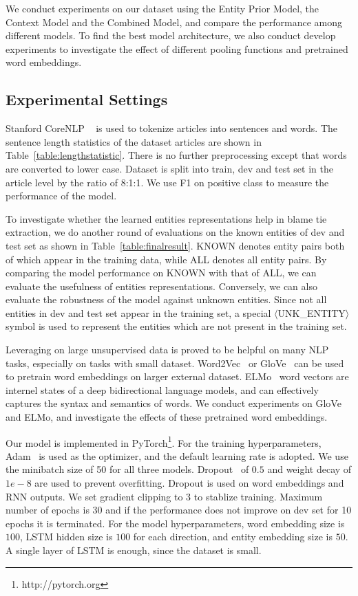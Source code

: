 \documentclass[11pt,a4paper]{article}
\begin{document}
We conduct experiments on our dataset using the Entity Prior Model, the Context Model and the Combined Model, and compare the performance among different models. To find the best model architecture, we also conduct develop experiments to investigate the effect of different pooling functions and pretrained word embeddings.

\subsection{Experimental Settings}

Stanford CoreNLP ~\cite{manning-EtAl:2014:P14-5} is used to tokenize articles into sentences and words. The sentence length statistics of the dataset articles are shown in Table~\ref{table:lengthstatistic}. There is no further preprocessing except that words are converted to lower case. Dataset is split into train, dev and test set in the article level by the ratio of 8:1:1. We use F1 on positive class to measure the performance of the model.

To investigate whether the learned entities representations help in blame tie extraction, we do another round of evaluations on the known entities of dev and test set as shown in Table~\ref{table:finalresult}. KNOWN denotes entity pairs both of which appear in the training data, while ALL denotes all entity pairs. By comparing the model performance on KNOWN with that of ALL, we can evaluate the usefulness of entities representations. Conversely, we can also evaluate the robustness of the model against unknown entities. Since not all entities in dev and test set appear in the training set, a special $\langle$UNK\_ENTITY$\rangle$ symbol is used to represent the entities which are not present in the training set.

Leveraging on large unsupervised data is proved to be helpful on many NLP tasks, especially on tasks with small dataset. Word2Vec~\cite{DBLP:journals/corr/abs-1301-3781} or GloVe~\cite{pennington2014glove} can be used to pretrain word embeddings on larger external dataset. ELMo~\cite{Peters:2018} word vectors are internel states of a deep bidirectional language models, and can effectively captures the syntax and semantics of words. We conduct experiments on GloVe and ELMo, and investigate the effects of these pretrained word embeddings.

Our model is implemented in PyTorch\footnote{http://pytorch.org}. For the training hyperparameters, Adam~\cite{kingma2014adam} is used as the optimizer, and the default learning rate is adopted. We use the minibatch size of 50 for all three models. Dropout~\cite{hinton2012improving} of $0.5$ and weight decay of $1e-8$ are used to prevent overfitting. Dropout is used on word embeddings and RNN outputs. We set gradient clipping to 3 to stablize training. Maximum number of epochs is 30 and if the performance does not improve on dev set for 10 epochs it is terminated. For the model hyperparameters, word embedding size is $100$, LSTM hidden size is $100$ for each direction, and entity embedding size is $50$. A single layer of LSTM is enough, since the dataset is small.
\end{document}
